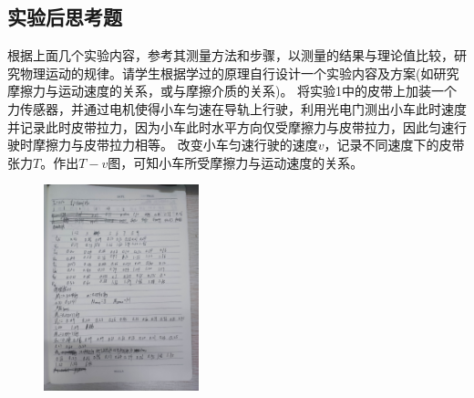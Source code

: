 \documentclass[dvipsnames, svgnames,a4paper,11pt]{article}
\begin{document}
\subsection{实验后思考题}
\begin{question}
	根据上面几个实验内容，参考其测量方法和步骤，以测量的结果与理论值比较，研究物理运动的规律。请学生根据学过的原理自行设计一个实验内容及方案(如研究摩擦力与运动速度的关系，或与摩擦介质的关系)。
	\tcblower
	将实验1中的皮带上加装一个力传感器，并通过电机使得小车匀速在导轨上行驶，利用光电门测出小车此时速度
	并记录此时皮带拉力，因为小车此时水平方向仅受摩擦力与皮带拉力，因此匀速行驶时摩擦力与皮带拉力相等。
	改变小车匀速行驶的速度$v$，记录不同速度下的皮带张力$T$。作出$T-v$图，可知小车所受摩擦力与运动速度的关系。
\end{question}
\clearpage




\clearpage
\appendix
\appendixpage
\addappheadtotoc
%
%
\begin{figure}[H]
	\centering
	\includegraphics[width=0.4\textwidth]{多普勒原件1.jpg}
\end{figure}
\end{document}
